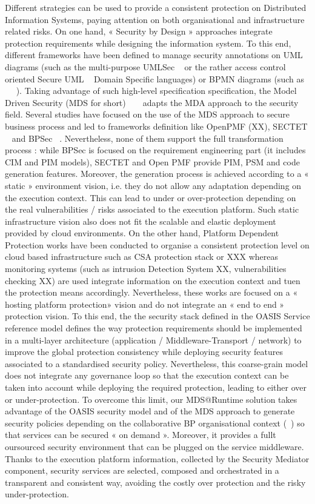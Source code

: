 \documentclass[runningheads,a4paper]{llncs}
\begin{document}
Different strategies can be used to provide a consistent protection on Distributed Information Systems, paying attention on both organisational and infrastructure related risks. On one hand, « Security by Design » approaches integrate protection requirements while designing the information system. To this end, different frameworks have been defined to manage security annotations on UML diagrams (such as the multi-purpose UMLSec ~\cite{JJ02} or the rather access control oriented  Secure UML ~\cite{LBD02} Domain Specific languages) or BPMN diagrams (such as ~\cite{WMS09} ~\cite{SSL09}). Taking advantage of such high-level specification specification, the Model Driven Security (MDS for short)  ~\cite{LS09} ~\cite{LZN14} adapts the MDA approach to the security field. Several studies have focused on the use of the MDS approach to secure business process and led to frameworks definition like OpenPMF (XX), SECTET ~\cite{AHB08} and BPSec ~\cite{RFP07}. Nevertheless, none of them support the full transformation process : while BPSec is focused on the requirement engineering part (it includes CIM and PIM models), SECTET and Open PMF provide PIM, PSM and code generation features. Moreover, the generation process is achieved according to a « static » environment vision, i.e. they do not allow any adaptation depending on the execution context. This can lead to under or over-protection depending on the real vulnerabilities / risks associated to the execution platform. Such static infrastructure vision also does not fit the scalable and elastic deployment provided by cloud environments.
On the other hand, Platform Dependent Protection works have been conducted to organise a consistent protection level on cloud based infrastructure such as CSA protection stack or XXX whereas monitoring systems (such as intrusion Detection System XX, vulnerabilities checking XX) are used integrate information on the execution context  and tuen the protection means accordingly. Nevertheless, these works are focused on a « hosting platform protection» vision and do not integrate an « end to end » protection vision. To this end, the the security stack defined in the  OASIS Service reference model defines the way protection requirements should be implemented in a multi-layer architecture (application / Middleware-Transport / network) to improve the global protection consistency while deploying security features associated to a standardised security policy. Nevertheless, this coarse-grain model does not integrate any governance loop so that the execution context can be taken into account while deploying the required protection, leading to either over or under-protection.
To overcome this limit, our MDS@Runtime solution takes advantage of the OASIS security model and of the MDS approach to generate security policies depending on the collaborative BP organisational context (~\cite{OFG13}) so that services can be secured « on demand ». Moreover, it provides a fullt oursourced security environment that can be plugged on the service middleware. Thanks to the execution platform information, collected by the Security Mediator component, security services are selected, composed and orchestrated in a transparent and consistent way, avoiding the costly over protection and the risky under-protection.
\end{document}
